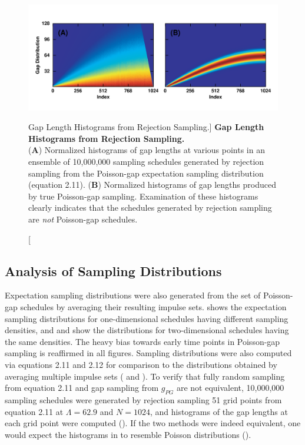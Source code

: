 \begin{figure}
\includegraphics[width=6in]{figs/dgs/10-rejhist.png}
\caption
      [Gap Length Histograms from Rejection Sampling.]{
  {\bf Gap Length Histograms from Rejection Sampling.}
  \\
  ({\bf A}) Normalized histograms of gap lengths at various points in an
  ensemble of 10,000,000 sampling schedules generated by rejection sampling
  from the Poisson-gap expectation sampling distribution (equation 2.11).
  ({\bf B}) Normalized histograms of gap lengths produced by true Poisson-gap
  sampling. Examination of these histograms clearly indicates that the
  schedules generated by rejection sampling are \emph{not} Poisson-gap
  schedules.
}
\label{figure.2.10}
\end{figure}

\subsection{Analysis of Sampling Distributions}

\begin{doublespace}
Expectation sampling distributions were also generated from the set of
Poisson-gap schedules by averaging their resulting impulse sets.
 shows the expectation sampling distributions
for one-dimensional schedules having different sampling densities, and
 and  show the distributions
for two-dimensional schedules having the same densities. The heavy bias
towards early time points in Poisson-gap sampling is reaffirmed in all
figures. Sampling distributions were also computed via equations
2.11 and 2.12 for comparison to the distributions obtained by averaging
multiple impulse sets ( and ).
To verify that fully random sampling from equation 2.11 and gap sampling
from $g_{PG}$ are not equivalent, 10,000,000 sampling schedules were generated
by rejection sampling 51 grid points from equation 2.11 at $\Lambda=62.9$
and $N=1024$, and histograms of the gap lengths at each grid point were
computed (). If the two methods were indeed
equivalent, one would expect the histograms in 
to resemble Poisson distributions ().
\end{doublespace}

